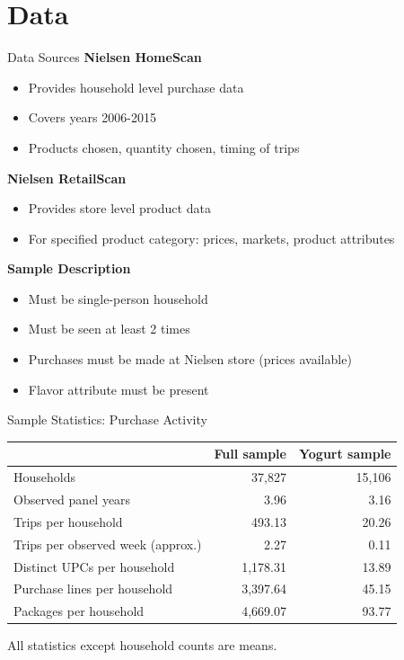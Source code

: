 \documentclass[aspectratio=169,professionalfonts]{beamer}
\begin{document}
\section{Data}
\begin{frame}{Data Sources}
  \textbf{Nielsen HomeScan}
  \begin{itemize}
    \item Provides household level purchase data
    \item Covers years 2006-2015
    \item Products chosen, quantity chosen, timing of trips
  \end{itemize}
  \textbf{Nielsen RetailScan}
  \begin{itemize}
    \item Provides store level product data
    \item For specified product category: prices, markets, product attributes
  \end{itemize}
  \textbf{Sample Description}
  \begin{itemize}
    \item Must be single-person household 
    \item Must be seen at least 2 times
    \item Purchases must be made at Nielsen store (prices available)
    \item Flavor attribute must be present
  \end{itemize}
\end{frame}
\begin{frame}{Sample Statistics: Purchase Activity}
  \centering
  \small
  \renewcommand{\arraystretch}{1.15}
  \begin{tabular}{lrr}
    \toprule
     & Full sample & Yogurt sample \\
    \midrule
    Households & 37,827 & 15,106 \\
    Observed panel years & 3.96 & 3.16 \\
    Trips per household & 493.13 & 20.26 \\
    Trips per observed week (approx.) & 2.27 & 0.11 \\
    Distinct UPCs per household & 1,178.31 & 13.89 \\
    Purchase lines per household & 3,397.64 & 45.15 \\
    Packages per household & 4,669.07 & 93.77 \\
    \bottomrule
  \end{tabular}

  \medskip
  {\footnotesize All statistics except household counts are means.}
\end{frame}
\end{document}
